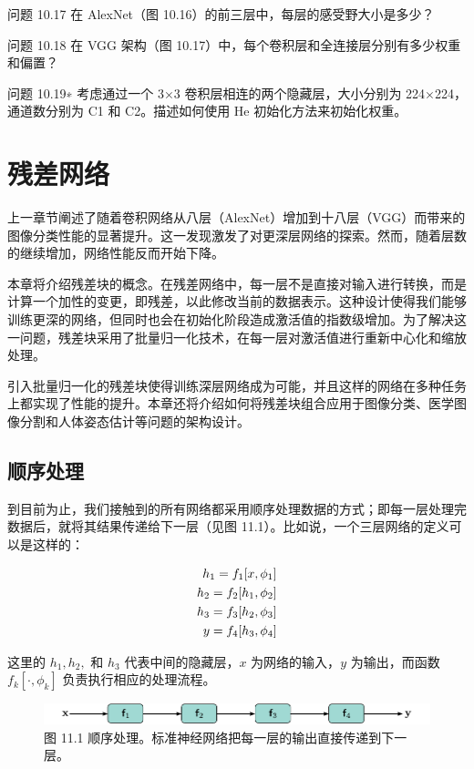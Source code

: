 \documentclass[lang=cn,newtx,10pt,scheme=chinese]{elegantbook}
\begin{document}
问题 10.17 在 AlexNet（图 10.16）的前三层中，每层的感受野大小是多少？

问题 10.18 在 VGG 架构（图 10.17）中，每个卷积层和全连接层分别有多少权重和偏置？

问题 10.19∗ 考虑通过一个 3×3 卷积层相连的两个隐藏层，大小分别为 224×224，通道数分别为 C1 和 C2。描述如何使用 He 初始化方法来初始化权重。

\chapter{残差网络}

上一章节阐述了随着卷积网络从八层（AlexNet）增加到十八层（VGG）而带来的图像分类性能的显著提升。这一发现激发了对更深层网络的探索。然而，随着层数的继续增加，网络性能反而开始下降。

本章将介绍残差块的概念。在残差网络中，每一层不是直接对输入进行转换，而是计算一个加性的变更，即残差，以此修改当前的数据表示。这种设计使得我们能够训练更深的网络，但同时也会在初始化阶段造成激活值的指数级增加。为了解决这一问题，残差块采用了批量归一化技术，在每一层对激活值进行重新中心化和缩放处理。

引入批量归一化的残差块使得训练深层网络成为可能，并且这样的网络在多种任务上都实现了性能的提升。本章还将介绍如何将残差块组合应用于图像分类、医学图像分割和人体姿态估计等问题的架构设计。
\section{顺序处理}
到目前为止，我们接触到的所有网络都采用顺序处理数据的方式；即每一层处理完数据后，就将其结果传递给下一层（见图 11.1）。比如说，一个三层网络的定义可以是这样的：

\begin{align}
h_1 = f_1[x, \phi_1] \notag \\
h_2 = f_2[h_1, \phi_2] \notag \\
h_3 = f_3[h_2, \phi_3] \notag \\
y = f_4[h_3, \phi_4] 
\end{align} 

这里的 \(h_1, h_2,\) 和 \(h_3\) 代表中间的隐藏层，\(x\) 为网络的输入，\(y\) 为输出，而函数 \(f_k[\cdot, \phi_k]\) 负责执行相应的处理流程。

\begin{figure}[ht!]
\centering
\includegraphics[width=0.7\linewidth]{PDFFigures/UDLChap11PDF/ResidualSequential.pdf}
\caption{图 11.1 顺序处理。标准神经网络把每一层的输出直接传递到下一层。}
\end{figure}
\end{document}
